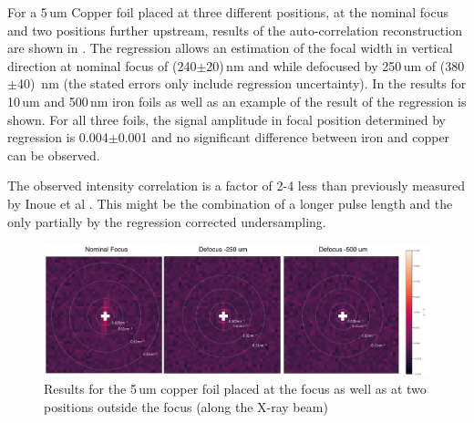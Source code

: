 For a 5\,um Copper foil placed at three different positions, at the nominal focus and two positions further upstream, results of the auto-correlation reconstruction are shown in .
The regression allows an estimation of the focal width in vertical direction at nominal focus of (240$\pm$20)\,nm and while defocused by 250\,um of (380$\pm$40)\, nm (the stated errors only include regression uncertainty).
In  the results for 10\,um and 500\,nm iron foils as well as an example of the result of the regression is shown.
For all three foils, the signal amplitude in focal position determined by regression is 0.004$\pm$0.001 and no significant difference between iron and copper can be observed. 

The observed intensity correlation is a factor of 2-4 less than previously measured by Inoue et al \cite{inoue2019}. This might be the combination of a longer pulse length and the only partially by the regression corrected undersampling. 

\begin{figure}
	\centering
	\includegraphics[width=0.9\linewidth]{images/Cu5um_reco2d.pdf}
	\caption{Results for the 5\,um copper foil placed at the focus as well as at two positions outside the focus (along the X-ray beam) }
	\label{fig:Cu5umreco2d}
\end{figure}

